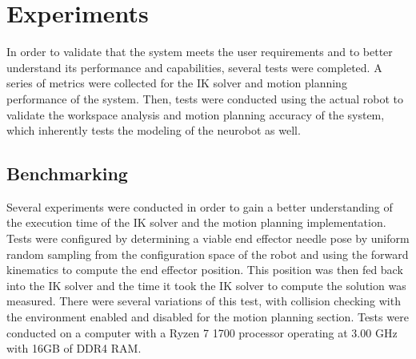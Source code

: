 \documentclass[12pt]{report}
\begin{document}


\chapter{Experiments}
In order to validate that the system meets the user requirements and to better understand its performance and capabilities, several tests were completed. A series of metrics were collected for the IK solver and motion planning performance of the system. Then, tests were conducted using the actual robot to validate the workspace analysis and motion planning accuracy of the system, which inherently tests the modeling of the neurobot as well. 


\section{Benchmarking}
Several experiments were conducted in order to gain a better understanding of the execution time of the IK solver and the motion planning implementation. Tests were configured by determining a viable end effector needle pose by uniform random sampling from the configuration space of the robot and using the forward kinematics to compute the end effector position. This position was then fed back into the IK solver and the time it took the IK solver to compute the solution was measured. There were several variations of this test, with collision checking with the environment enabled and disabled for the motion planning section. Tests were conducted on a computer with a Ryzen 7 1700 processor operating at 3.00 GHz with 16GB of DDR4 RAM.
\end{document}
